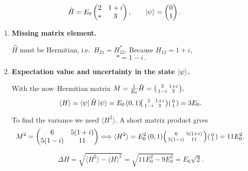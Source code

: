 \documentclass[12pt]{article}
\begin{document}
\[
    \hat H = E_{0}
    \begin{pmatrix}
       2 & 1+i\\
       * & 3
    \end{pmatrix},\qquad
    \ket{\psi}=\begin{pmatrix}0\\ 1\end{pmatrix}.
\]

\begin{enumerate}[label=\textbf{\alph*)},itemsep=1.5\baselineskip]

\item \textbf{Missing matrix element.}

$\hat H$ must be Hermitian, i.e.\ $H_{21}=H_{12}^{*}$.
Because $H_{12}=1+i$,
\[
\boxed{\,* = 1-i\,}.
\]

\item \textbf{Expectation value and uncertainty in the state $\ket{\psi}$.}

With the now–Hermitian matrix
\(
M = \tfrac1{E_{0}}\hat H=
\begin{psmallmatrix}
2 & 1+i\\ 1-i & 3
\end{psmallmatrix},
\)
\[
\langle H\rangle
= \bra{\psi}\hat H\ket{\psi}
= E_{0}\,(0,1)\!
    \begin{psmallmatrix} 2&1+i\\1-i&3\end{psmallmatrix}
    \begin{psmallmatrix}0\\1\end{psmallmatrix}
= 3E_{0}.
\]

To find the variance we need $\langle H^{2}\rangle$.
A short matrix product gives
\[
M^{2}=
\begin{pmatrix}
 6 & 5(1+i)\\ 5(1-i) & 11
\end{pmatrix}
\Longrightarrow
\langle H^{2}\rangle = E_{0}^{2}\,(0,1)
  \begin{psmallmatrix}6&5(1+i)\\5(1-i)&11\end{psmallmatrix}
  \begin{psmallmatrix}0\\1\end{psmallmatrix}
= 11E_{0}^{2}.
\]

\[
\Delta H=\sqrt{\langle H^{2}\rangle-\langle H\rangle^{2}}
        =\sqrt{11E_{0}^{2}-9E_{0}^{2}}
        =E_{0}\sqrt{2}.
\]


\end{enumerate}
\end{document}
